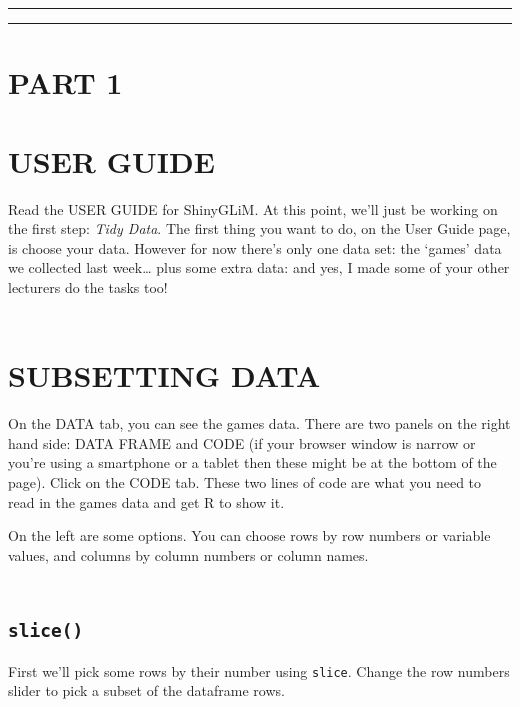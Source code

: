 \documentclass[
]{book}
\begin{document}
\begin{center}\rule{0.5\linewidth}{0.5pt}\end{center}

\begin{center}\rule{0.5\linewidth}{0.5pt}\end{center}

\hypertarget{part-1}{%
\section{PART 1}\label{part-1}}

\hypertarget{user-guide}{%
\section{USER GUIDE}\label{user-guide}}

Read the USER GUIDE for ShinyGLiM. At this point, we'll just be working on the
first step: \emph{Tidy Data}. The first thing you want to do, on the User Guide page,
is choose your data. However for now there's only one data set: the `games'
data we collected last week\ldots{} plus some extra data: and yes, I made some of your
other lecturers do the tasks too!\\
~\\

\hypertarget{subsetting-data}{%
\section{SUBSETTING DATA}\label{subsetting-data}}

On the DATA tab, you can see the games data. There are two panels on the right
hand side: DATA FRAME and CODE (if your browser window is narrow or you're
using a smartphone or a tablet then these might be at the bottom of the
page). Click on the CODE tab. These two lines of
code are what you need to read in the games data and get R to show it.

On the left are some options. You can choose rows by row numbers or variable
values, and columns by column numbers or column names.\\
~\\

\hypertarget{slice}{%
\subsection{\texorpdfstring{\texttt{slice()}}{slice()}}\label{slice}}

First we'll pick some rows by their number using \texttt{slice}. Change the row numbers
slider to pick a subset of the dataframe rows.
\end{document}
